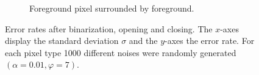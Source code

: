 \begin{figure}[H]
\begin{subfigure}[t]{0.48\linewidth}
		\caption{Foreground pixel surrounded by foreground.}
		\label{fig: alpha0.01_phi7_foreground_free}
	\end{subfigure}
	\caption{Error rates after binarization, opening and closing. The $x$-axes display the standard deviation $\sigma$ and the $y$-axes the error rate. For each pixel type 1000 different noises were randomly generated $(\alpha = 0.01, \varphi = 7)$.}
	\label{fig: alpha0.01_phi7}
\end{figure}